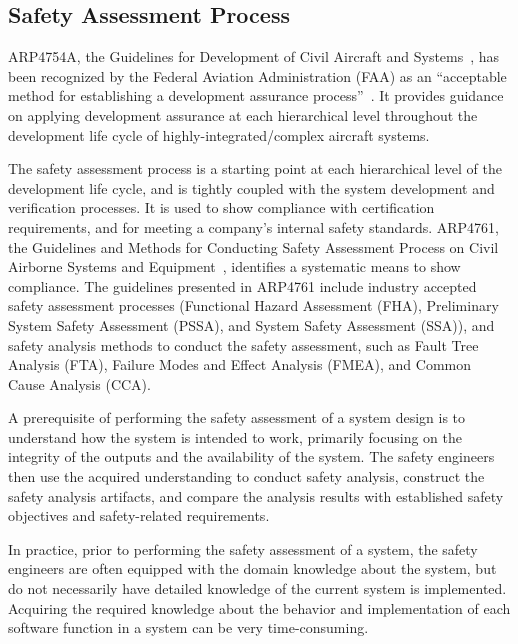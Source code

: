 \subsection{Safety Assessment Process}
\label{subsec:process}

ARP4754A, the Guidelines for Development of Civil Aircraft and Systems~\cite{SAE:ARP4754A}, has been recognized by the Federal Aviation Administration (FAA) as an ``acceptable method for establishing a development assurance process''~\cite{AC:20-174}. It provides guidance on applying development assurance at each hierarchical level throughout the development life cycle of highly-integrated/complex aircraft systems.


The safety assessment process is a starting point at each hierarchical level of the development life cycle, and is tightly coupled with the system development and verification processes. It is used to show compliance with certification requirements, and for meeting a company's internal safety standards. ARP4761, the Guidelines and Methods for Conducting Safety Assessment Process on Civil Airborne Systems and Equipment~\cite{SAE:ARP4761},  identifies a systematic means to show compliance. The guidelines presented in ARP4761 include industry accepted safety assessment processes (Functional Hazard Assessment (FHA), Preliminary System Safety Assessment (PSSA), and System Safety Assessment (SSA)), and safety analysis methods to conduct the safety assessment, 
such as Fault Tree Analysis (FTA), Failure Modes and Effect Analysis (FMEA), and Common Cause Analysis (CCA).

A prerequisite of performing the safety assessment of a system design is to understand how the system is intended to work, primarily focusing on the integrity of the outputs and the availability of the system. The safety engineers then use the acquired understanding to conduct safety analysis, construct the safety analysis artifacts, and compare the analysis results with established safety objectives and safety-related requirements. 

In practice, prior to performing the safety assessment of a system, the safety engineers are often equipped with the domain knowledge about the system, but do not necessarily have detailed knowledge of the current system is implemented. Acquiring the required knowledge about the behavior and implementation of each software function in a system can be very time-consuming. 

